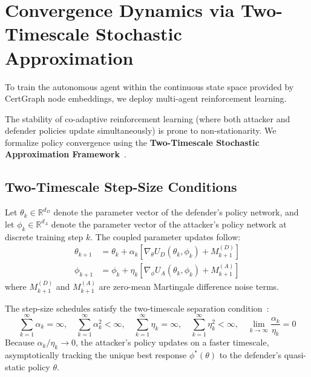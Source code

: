 \section{Convergence Dynamics via Two-Timescale Stochastic Approximation}
To train the autonomous agent within the continuous state space provided by CertGraph node embeddings, we deploy multi-agent reinforcement learning.

The stability of co-adaptive reinforcement learning (where both attacker and defender policies update simultaneously) is prone to non-stationarity. We formalize policy convergence using the \textbf{Two-Timescale Stochastic Approximation Framework}~\cite{borkar2008stochastic}.

\subsection{Two-Timescale Step-Size Conditions}
Let $\theta_k \in \mathbb{R}^{d_D}$ denote the parameter vector of the defender's policy network, and let $\phi_k \in \mathbb{R}^{d_A}$ denote the parameter vector of the attacker's policy network at discrete training step $k$. The coupled parameter updates follow:
\begin{align}
\theta_{k+1} &= \theta_k + \alpha_k \left[ \nabla_\theta U_D(\theta_k, \phi_k) + M_{k+1}^{(D)} \right] \\
\phi_{k+1} &= \phi_k + \eta_k \left[ \nabla_\phi U_A(\theta_k, \phi_k) + M_{k+1}^{(A)} \right]
\end{align}
where $M_{k+1}^{(D)}$ and $M_{k+1}^{(A)}$ are zero-mean Martingale difference noise terms.

The step-size schedules satisfy the two-timescale separation condition~\cite{borkar2008stochastic}:
\begin{equation}
\sum_{k=1}^\infty \alpha_k = \infty, \quad \sum_{k=1}^\infty \alpha_k^2 < \infty, \quad \sum_{k=1}^\infty \eta_k = \infty, \quad \sum_{k=1}^\infty \eta_k^2 < \infty, \quad \lim_{k \to \infty} \frac{\alpha_k}{\eta_k} = 0
\end{equation}
Because $\alpha_k / \eta_k \to 0$, the attacker's policy updates on a faster timescale, asymptotically tracking the unique best response $\phi^*(\theta)$ to the defender's quasi-static policy $\theta$.

